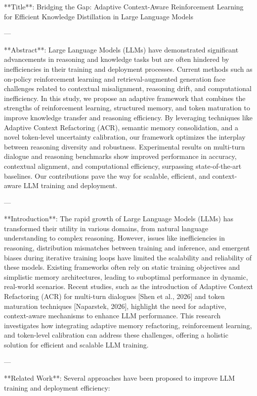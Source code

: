 **Title**: Bridging the Gap: Adaptive Context-Aware Reinforcement Learning for Efficient Knowledge Distillation in Large Language Models

---

**Abstract**:  
Large Language Models (LLMs) have demonstrated significant advancements in reasoning and knowledge tasks but are often hindered by inefficiencies in their training and deployment processes. Current methods such as on-policy reinforcement learning and retrieval-augmented generation face challenges related to contextual misalignment, reasoning drift, and computational inefficiency. In this study, we propose an adaptive framework that combines the strengths of reinforcement learning, structured memory, and token maturation to improve knowledge transfer and reasoning efficiency. By leveraging techniques like Adaptive Context Refactoring (ACR), semantic memory consolidation, and a novel token-level uncertainty calibration, our framework optimizes the interplay between reasoning diversity and robustness. Experimental results on multi-turn dialogue and reasoning benchmarks show improved performance in accuracy, contextual alignment, and computational efficiency, surpassing state-of-the-art baselines. Our contributions pave the way for scalable, efficient, and context-aware LLM training and deployment.

---

**Introduction**:  
The rapid growth of Large Language Models (LLMs) has transformed their utility in various domains, from natural language understanding to complex reasoning. However, issues like inefficiencies in reasoning, distribution mismatches between training and inference, and emergent biases during iterative training loops have limited the scalability and reliability of these models. Existing frameworks often rely on static training objectives and simplistic memory architectures, leading to suboptimal performance in dynamic, real-world scenarios. Recent studies, such as the introduction of Adaptive Context Refactoring (ACR) for multi-turn dialogues [Shen et al., 2026] and token maturation techniques [Naparstek, 2026], highlight the need for adaptive, context-aware mechanisms to enhance LLM performance. This research investigates how integrating adaptive memory refactoring, reinforcement learning, and token-level calibration can address these challenges, offering a holistic solution for efficient and scalable LLM training.

---

**Related Work**:  
Several approaches have been proposed to improve LLM training and deployment efficiency:

